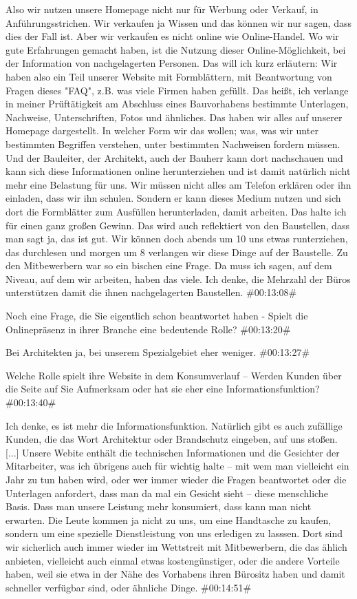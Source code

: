 \begin{description}
\Andre Also wir nutzen unsere Homepage nicht nur für Werbung oder Verkauf, in Anführungsstrichen. Wir verkaufen ja Wissen und das können wir nur sagen, dass dies der Fall ist. Aber wir verkaufen es nicht online wie Online-Handel. Wo wir gute Erfahrungen gemacht haben, ist die Nutzung dieser Online-Möglichkeit, bei der Information von nachgelagerten Personen. Das will ich kurz erläutern: Wir haben also ein Teil unserer Website mit Formblättern, mit Beantwortung von Fragen dieses "FAQ", z.B. was viele Firmen haben gefüllt. Das heißt, ich verlange in meiner Prüftätigkeit am Abschluss eines Bauvorhabens bestimmte Unterlagen, Nachweise, Unterschriften, Fotos und ähnliches. Das haben wir alles auf unserer Homepage dargestellt. In welcher Form wir das wollen; was, was wir unter bestimmten Begriffen verstehen, unter bestimmten Nachweisen fordern müssen. Und der Bauleiter, der Architekt, auch der Bauherr kann dort nachschauen und kann sich diese Informationen online herunterziehen und ist damit natürlich nicht mehr eine Belastung für uns. Wir müssen nicht alles am Telefon erklären oder ihn einladen, dass wir ihn schulen. Sondern er kann dieses Medium nutzen und sich dort die Formblätter zum Ausfüllen herunterladen, damit arbeiten. Das halte ich für einen ganz großen Gewinn. Das wird auch reflektiert von den Baustellen, dass man sagt ja, das ist gut. Wir können doch abends um 10 uns etwas runterziehen, das durchlesen und morgen um 8 verlangen wir diese Dinge auf der Baustelle. Zu den Mitbewerbern war so ein bischen eine Frage. Da muss ich sagen, auf dem Niveau, auf dem wir arbeiten, haben das viele. Ich denke, die Mehrzahl der Büros unterstützen damit die ihnen nachgelagerten Baustellen. \#00:13:08\#

\Fabian Noch eine Frage, die Sie eigentlich schon beantwortet haben - Spielt die Onlinepräsenz in ihrer Branche eine bedeutende Rolle? \#00:13:20\# %

\Andre Bei Architekten ja, bei unserem Spezialgebiet eher weniger. \#00:13:27\#

\Fabian Welche Rolle spielt ihre Website in dem Konsumverlauf – Werden Kunden über die Seite auf Sie Aufmerksam oder hat sie eher eine Informationsfunktion? \#00:13:40\#

\Andre Ich denke, es ist mehr die Informationsfunktion. Natürlich gibt es auch zufällige Kunden, die das Wort Architektur oder Brandschutz eingeben, auf uns stoßen. [...] Unsere Webite enthält die technischen Informationen und die Gesichter der Mitarbeiter, was ich übrigens auch für wichtig halte – mit wem man vielleicht ein Jahr zu tun haben wird, oder wer immer wieder die Fragen beantwortet oder die Unterlagen anfordert, dass man da mal ein Gesicht sieht – diese menschliche Basis. Dass man unsere Leistung mehr konsumiert, dass kann man nicht erwarten. Die Leute kommen ja nicht zu uns, um eine Handtasche zu kaufen, sondern um eine spezielle Dienstleistung von uns erledigen zu lasssen. Dort sind wir sicherlich auch immer wieder im Wettstreit mit Mitbewerbern, die das ählich anbieten, vielleicht auch einmal etwas kostengünstiger, oder die andere Vorteile haben, weil sie etwa in der Nähe des Vorhabens ihren Bürositz haben und damit schneller verfügbar sind, oder ähnliche Dinge. \#00:14:51\#


\end{description}
